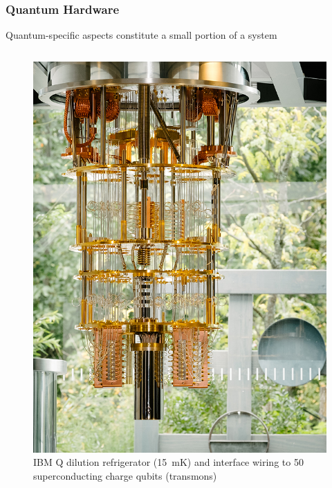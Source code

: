 \documentclass[handout]{beamer}
\begin{document}
\begin{frame}
  \frametitle{Quantum Hardware}
  Quantum-specific aspects constitute a small portion of a system
  \begin{columns}
    \begin{figure}
      \centering
    \includegraphics[width=0.75\linewidth]{Graphics/CEO-Forum_IBM-50Q-system_thumb.jpg}
      \caption{IBM Q dilution refrigerator (\SI{15}{\milli\kelvin}) and interface wiring to 50 superconducting charge qubits (transmons)~\cite{IBMQ-blog}}
    \end{figure}


\end{columns}
\end{frame}
\end{document}

